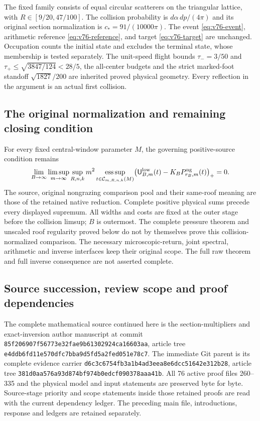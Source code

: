\documentclass[11pt,reqno]{amsart}
\numberwithin{equation}{section}
\theoremstyle{definition}\newtheorem{definition}[theorem]{Definition}
\theoremstyle{remark}\newtheorem{remark}[theorem]{Remark}
\begin{document}
The fixed family consists of equal circular scatterers on the
triangular lattice, with $R\in[9/20,47/100]$. The collision probability
is $d\alpha\,dp/(4\pi)$ and its original section normalization is
$c_*=91/(10000\pi)$. The event \eqref{eq:v76-event}, arithmetic
reference \eqref{eq:v76-reference}, and target \eqref{eq:v76-target}
are unchanged. Occupation counts the initial state and excludes
the terminal state, whose membership is tested separately.
The unit-speed flight bounds
$\tau_-=3/50$ and $\tau_+\le\sqrt{3847/124}<28/5$, the all-center
budgets and the strict marked-foot standoff $\sqrt{1827}/200$
are inherited proved physical geometry. Every reflection in the
argument is an actual first collision.



\subsection*{The original normalization and remaining closing condition}
For every fixed central-window parameter $M$, the governing
positive-source condition remains
\begin{equation}\label{eq:sc-original-obligation}
 \lim_{B\to\infty}\limsup_{m\to\infty}\sup_{R,n,k}
 m^2\operatorname*{ess\,sup}_{t\in\mathcal C_{m,R,n,k}(M)}
 \bigl(\mathsf U^{\rm low}_{B,m}(t)
                    -K_BP^{\rm ng}_{r_B,m}(t)\bigr)_+=0.
\end{equation}
The source, original nongrazing comparison pool and their same-roof
meaning are those of the retained native reduction. Complete positive
physical sums precede every displayed supremum. All widths and costs
are fixed at the outer stage before the collision limsup; $B$ is
outermost. The complete pressure theorem and unscaled roof regularity
proved below do not by themselves prove this collision-normalized
comparison. The necessary microscopic-return, joint spectral,
arithmetic and inverse interfaces keep their original scope. The
full raw theorem and full inverse consequence are not asserted complete.

\subsection*{Source succession, review scope and proof dependencies}
The complete mathematical source continued here is the
section-multipliers and exact-inversion author manuscript at commit
\texttt{85f20690\allowbreak{}7f56773e\allowbreak{}32fae9b6\allowbreak{}1302924c\allowbreak{}a16603aa},
article tree
\texttt{e4ddb6fd\allowbreak{}11e570df\allowbreak{}c7bba9d5\allowbreak{}fd5a2fed\allowbreak{}051e78c7}.
The immediate Git parent is its complete evidence carrier
\texttt{d6c3c675\allowbreak{}4fb3a1b4\allowbreak{}ad3eea8e\allowbreak{}6dcc5164\allowbreak{}2e312b28},
article tree
\texttt{381d0aa5\allowbreak{}76a93d87\allowbreak{}4bf974b0\allowbreak{}edcf0903\allowbreak{}78aaa41b}.
All 76 active proof files 260--335 and the physical model and
input statements are preserved byte for byte. Source-stage
priority and scope statements inside those retained proofs are
read with the current dependency ledger. The preceding main
file, introductions, response and ledgers are retained separately.
\end{document}
